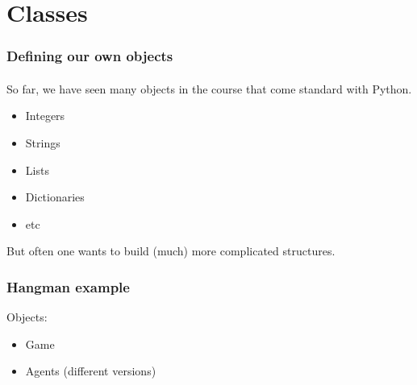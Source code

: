 \section{Classes} %
\label{sec:classes}

\begin{frame}\frametitle{Defining our own objects}
    \framesubtitle{}

    So far, we have seen many objects in the course that come standard with Python.

    \begin{itemize}
        \item Integers
        \item Strings
        \item Lists
        \item Dictionaries
        \item etc
    \end{itemize}

    \pause

    But often one wants to build (much) more complicated structures.

\end{frame}

\begin{frame}\frametitle{Hangman example}

    Objects:
    \begin{itemize}
        \item Game
        \item Agents (different versions)
    \end{itemize}
\end{frame}



